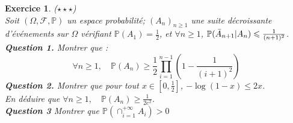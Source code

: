 \documentclass[12pt,a4paper]{article}
\newtheorem{exercice}{Exercice}
\renewcommand{\leq}{\leqslant}
\renewcommand{\geq}{\geqslant}
\begin{document}
\begin{exercice} ($\star \star \star$) \\
Soit $(\Omega, \mathcal{F}, \mathbb{P})$ un espace probabilité; $(A_n)_{n \geq 1}$ une suite décroissante d'événements sur $\Omega$ vérifiant $\mathbb{P}(A_1) = \frac{1}{2}$, et $\forall n\geq 1$, $\mathbb{P}(\Bar{A}_{n+1} | A_n) \leq \frac{1}{(n+1)^2}$. \\

\textbf{Question 1.} Montrer que : \\
\[
\forall n\geq 1, \quad \mathbb{P}(A_n) \geq \frac{1}{2}\prod_{i=1}^{n-1}( 1 - \frac{1}{(i+1)^2})
\] 
\textbf{Question 2.} Montrer que pour tout $x \in [0, \frac{1}{2} ]$, $-\log (1 - x ) \leq 2x$.\\  
En déduire que  $\forall n\geq 1,\quad \mathbb{P}(A_n) \geq \frac{1}{2e^2}$. \\

\textbf{Question 3} Montrer que $\mathbb{P}(\cap_{i=1}^{+\infty} A_i ) > 0$
    
\end{exercice}
\end{document}
